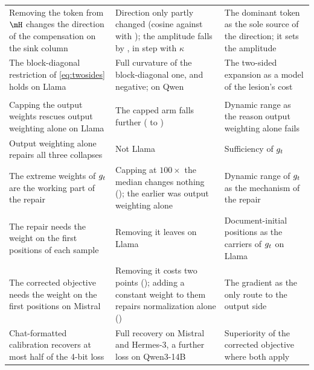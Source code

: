 \begin{center}
\begin{longtable}{>{\raggedright\arraybackslash}p{4.2cm}>{\raggedright\arraybackslash}p{5.2cm}>{\raggedright\arraybackslash}p{3.6cm}}
Removing the \bos{} token from $\hess$ changes the direction of the compensation on the sink column & Direction only partly changed (cosine \PatCosNob{} against \PatCosBos{} with \bos{}); the amplitude falls by \PatNormRatioRange{}, in step with $\kappa$ & The dominant token as the sole source of the direction; it sets the amplitude \\
The block-diagonal restriction of \cref{eq:twosides} holds on Llama & Full curvature \CrossRatioL{} of the block-diagonal one, and negative; \CrossRatioQ{} on Qwen & The two-sided expansion as a model of the lesion's cost \\
\addlinespace[3pt]\multicolumn{3}{l}{\emph{The repair}} \\\addlinespace[1pt]
Capping the output weights rescues output weighting alone on Llama & The capped arm falls further (\LgonlyIF{} to \LcapIF{}) & Dynamic range as the reason output weighting alone fails \\
Output weighting alone repairs all three collapses & Not Llama & Sufficiency of $g_t$ \\
The extreme weights of $g_t$ are the working part of the repair & Capping at $100\times$ the median changes nothing (\LcorrCapIF{}); the earlier \LcapIF{} was output weighting alone & Dynamic range of $g_t$ as the mechanism of the repair \\
The repair needs the weight on the first positions of each sample & Removing it leaves \CorrPosDropIF{} on Llama & Document-initial positions as the carriers of $g_t$ on Llama \\
The corrected objective needs the weight on the first positions on Mistral & Removing it costs two points (\McorrPosDropIF{}); adding a constant weight to them repairs normalization alone (\MposTenIF{}) & The gradient as the only route to the output side \\
Chat-formatted calibration recovers at most half of the 4-bit loss & Full recovery on Mistral and Hermes-3, a further loss on Qwen3-14B & Superiority of the corrected objective where both apply \\
\end{longtable}
\end{center}
